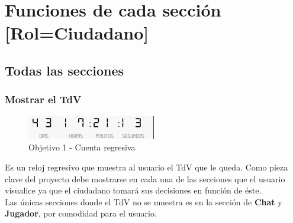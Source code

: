 \newpage

\section{Funciones de cada sección [Rol=Ciudadano]}

\subsection{Todas las secciones}

\subsubsection{Mostrar el TdV}
\begin{figure}[ht]
  \centering
    \includegraphics[width=0.5\textwidth]{imagenes/Objetivo1.png}
    \caption{Objetivo 1 - Cuenta regresiva}
    \label{objetivoIm1}
\end{figure}

Es un reloj regresivo que muestra al usuario el TdV que le queda. Como pieza clave del proyecto debe mostrarse en cada una de las secciones que el usuario visualice ya que el ciudadano tomará sus decisiones en función de éste.\\

Las únicas secciones donde el TdV no se muestra es en la sección de \textbf{Chat} y \textbf{Jugador}, por comodidad para el usuario.

